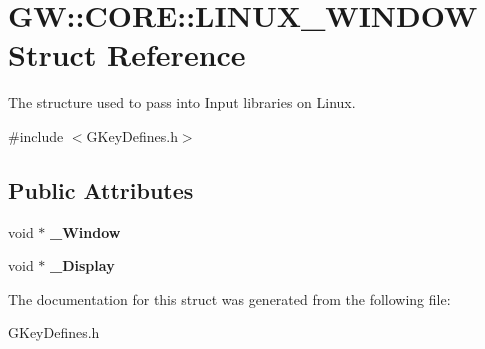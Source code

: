 \hypertarget{struct_g_w_1_1_c_o_r_e_1_1_l_i_n_u_x___w_i_n_d_o_w}{}\section{GW\+:\+:C\+O\+RE\+:\+:L\+I\+N\+U\+X\+\_\+\+W\+I\+N\+D\+OW Struct Reference}
\label{struct_g_w_1_1_c_o_r_e_1_1_l_i_n_u_x___w_i_n_d_o_w}


The structure used to pass into Input libraries on Linux.  




{\ttfamily \#include $<$G\+Key\+Defines.\+h$>$}

\subsection*{Public Attributes}
\begin{DoxyCompactItemize}
\item 
\hypertarget{struct_g_w_1_1_c_o_r_e_1_1_l_i_n_u_x___w_i_n_d_o_w_a51fadcfa59276c1c0ab7fdc6af733f4f}{}\label{struct_g_w_1_1_c_o_r_e_1_1_l_i_n_u_x___w_i_n_d_o_w_a51fadcfa59276c1c0ab7fdc6af733f4f} 
void $\ast$ {\bfseries \+\_\+\+Window}
\item 
\hypertarget{struct_g_w_1_1_c_o_r_e_1_1_l_i_n_u_x___w_i_n_d_o_w_a1b1d6b2b7b133fc54f67dcce4c2f1ed5}{}\label{struct_g_w_1_1_c_o_r_e_1_1_l_i_n_u_x___w_i_n_d_o_w_a1b1d6b2b7b133fc54f67dcce4c2f1ed5} 
void $\ast$ {\bfseries \+\_\+\+Display}
\end{DoxyCompactItemize}


The documentation for this struct was generated from the following file\+:\begin{DoxyCompactItemize}
\item 
G\+Key\+Defines.\+h\end{DoxyCompactItemize}
